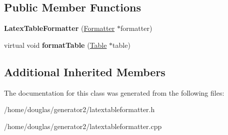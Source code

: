 \subsection*{Public Member Functions}
\begin{DoxyCompactItemize}
\item 
{\bfseries Latex\+Table\+Formatter} (\hyperlink{classFormatter}{Formatter} $\ast$formatter)\hypertarget{classLatexTableFormatter_a18735d8bf6647149ac69f923129d70a7}{}\label{classLatexTableFormatter_a18735d8bf6647149ac69f923129d70a7}

\item 
virtual void {\bfseries format\+Table} (\hyperlink{classTable}{Table} $\ast$table)\hypertarget{classLatexTableFormatter_ad2bd549da8ca3463ef668cf7b92a2b3d}{}\label{classLatexTableFormatter_ad2bd549da8ca3463ef668cf7b92a2b3d}

\end{DoxyCompactItemize}
\subsection*{Additional Inherited Members}


The documentation for this class was generated from the following files\+:\begin{DoxyCompactItemize}
\item 
/home/douglas/generator2/latextableformatter.\+h\item 
/home/douglas/generator2/latextableformatter.\+cpp\end{DoxyCompactItemize}

